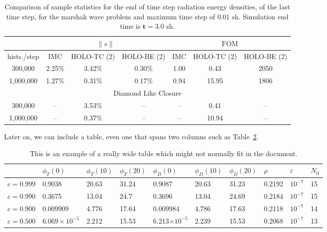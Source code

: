 \documentclass{anstrans}
\newcommand{\FOM}{\ensuremath{\text{FOM}}}
\renewcommand{\ss}{\ensuremath{\|s\|}}
\begin{document}
\begin{table}[H]
\centering
\caption{\label{tab:marshak_cont} {Comparison of sample statistics for the
    end of time step radiation energy densities, of the last time step, for the marshak
    wave problem and maximum time step of $0.01$ sh.  Simulation end time is $\mathbf{t=3.0}$ sh.}}
\vspace{-0.1in}
\begin{tabular}{|c|ccc|ccc|}\cline{2-7}
    \multicolumn{1}{c|}{}       & \multicolumn{3}{|c|}{\ss} &
    \multicolumn{3}{|c|}{\FOM} \\ \hline
hists./step   & IMC & HOLO-TC (2) & HOLO-BE (2) &  IMC   & HOLO-TC (2) & HOLO-BE (2) \\ \hline
  300,000     & 2.25\%  & 3.42\% & 0.30\%       &  1.00  &   0.43    & 2050          \\  
  1,000,000   & 1.27\%  & 0.31\% & 0.17\%       &  0.94  &  15.95    & 1806          \\ \hline
  \multicolumn{7}{|c|}{Diamond Like Closure} \\ \hline
  300,000     & --  & 3.53\% & --   &  --  &   0.41   & --  \\  
  1,000,000   & --  & 0.37\% & --   &  --  &  10.94   & --  \\ \hline
\end{tabular}
\end{table}




Later on, we can include a table, even one that spans two columns such as
Table~\ref{tab:widetable}.
\begin{table}[htb]
  \centering
\begin{tabular}{llllllllll}\toprule
      & $\phi_T(0)$      & $\phi_T(10)$      & $\phi_T(20)$      &
      $\phi_D(0)$      & $\phi_D(10)$      & $\phi_D(20)$      & $\rho$      &
      $\varepsilon$      & $N_\text{it}$
\\ \midrule
$c=0.999$  & 0.9038 & 20.63 & 31.24 & 0.9087 & 20.63 & 31.23 & 0.2192 & $10^{-7}$ & 15
\\
$c=0.990$  & 0.3675 & 13.04 & 24.7 & 0.3696 & 13.04 & 24.69 & 0.2184 & $10^{-7}$ & 15
\\
$c=0.900$  & 0.009909 & 4.776 & 17.64 & 0.009984 & 4.786 & 17.63 & 0.2118 & $10^{-7}$ & 14
\\
$c=0.500$  & $6.069\times 10^{-5}$ & 2.212 & 15.53 & 6.213$\times 10^{-5}$ & 2.239 & 15.53 & 0.2068 & $10^{-7}$ & 13
\\
\bottomrule
\end{tabular}
  \caption{This is an example of a really wide table which might not normally
  fit in the document.}
  \label{tab:widetable}
\end{table}
\end{document}

